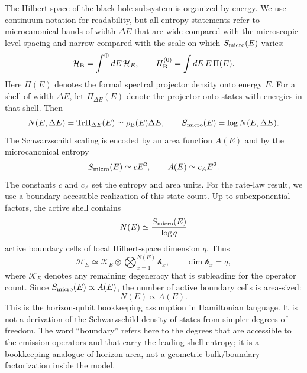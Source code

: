 \documentclass[12pt]{article}
\newcommand{\Tr}{\mathrm{Tr}}
\newcommand{\HB}{\mathcal H_{\rm B}}
\newcommand{\Smicro}{S_{\rm micro}}
\newcommand{\rhoB}{\rho_{\rm B}}
\begin{document}
The Hilbert space of the black-hole subsystem is organized by energy.  We use
continuum notation for readability, but all entropy statements refer to
microcanonical bands of width $\Delta E$ that are wide compared with the
microscopic level spacing and narrow compared with the scale on which
$\Smicro(E)$ varies:
\begin{equation}
    \HB=\int^\oplus dE\,\mathcal H_E,
    \qquad
    H_{\rm B}^{(0)}=\int dE\,E\,\Pi(E).
\end{equation}
Here $\Pi(E)$ denotes the formal spectral projector density onto energy $E$.
For a shell of width $\Delta E$, let $\Pi_{\Delta E}(E)$ denote the projector
onto states with energies in that shell.  Then
\begin{equation}
    N(E,\Delta E)=\Tr \Pi_{\Delta E}(E)\simeq \rhoB(E)\Delta E,
    \qquad
    \Smicro(E)=\log N(E,\Delta E).
\end{equation}
The Schwarzschild scaling is encoded by an area function $A(E)$ and by the
microcanonical entropy
\begin{equation}
    \Smicro(E)\simeq cE^2,
    \qquad
    A(E)\simeq c_A E^2.
\end{equation}
The constants $c$ and $c_A$ set the entropy and area units.
For the rate-law result, we use a boundary-accessible realization of this state
count.  Up to subexponential factors, the active shell contains
\begin{equation}
    N(E)\simeq \frac{\Smicro(E)}{\log q}
\end{equation}
active boundary cells of local Hilbert-space dimension $q$.  Thus
\begin{equation}
    \mathcal H_E\simeq
    \mathcal K_E\otimes
    \bigotimes_{x=1}^{N(E)}\mathcal h_x,
    \qquad
    \dim \mathcal h_x=q,
\end{equation}
where $\mathcal K_E$ denotes any remaining degeneracy that is subleading for
the operator count.  Since $\Smicro(E)\propto A(E)$, the number of active
boundary cells is area-sized:
\begin{equation}
    N(E)\propto A(E).
\end{equation}
This is the horizon-qubit bookkeeping assumption in Hamiltonian language.  It
is not a derivation of the Schwarzschild density of states from simpler
degrees of freedom.  The word ``boundary'' refers here to the degrees that are
accessible to the emission operators and that carry the leading shell entropy;
it is a bookkeeping analogue of horizon area, not a geometric bulk/boundary
factorization inside the model.
\end{document}
